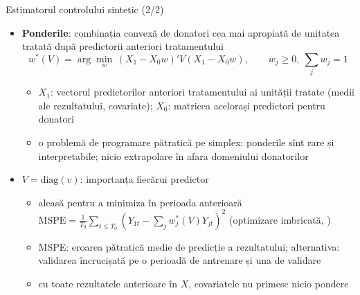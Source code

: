 \begin{frame}{Estimatorul controlului sintetic (2/2)}
\itemsize{\small}
\begin{itemize}
    \item \textbf{Ponderile}: combinația convexă de donatori cea mai apropiată de unitatea tratată după predictorii anteriori tratamentului \[ w^*(V) = \arg\min_w\, (X_1 - X_0w)'V(X_1 - X_0w), \qquad w_j \ge 0,\ \sum_j w_j = 1 \]
    \begin{itemize}
        \item $X_1$: vectorul predictorilor anteriori tratamentului ai unității tratate (medii ale rezultatului, covariate); $X_0$: matricea acelorași predictori pentru donatori
        \item o problemă de programare pătratică pe simplex: ponderile sînt rare și interpretabile; nicio extrapolare în afara domeniului donatorilor
    \end{itemize}
    \item $V = \mathrm{diag}(v)$: importanța fiecărui predictor
    \begin{itemize}
        \item aleasă pentru a minimiza în perioada anterioară $\mathrm{MSPE} = \frac{1}{T_0}\sum_{t \le T_0}(Y_{1t} - \sum_j w_j^*(V)Y_{jt})^2$ (optimizare imbricată, )
        \item MSPE: eroarea pătratică medie de predicție a rezultatului; alternativa: validarea încrucișată pe o perioadă de antrenare și una de validare 
        \item cu toate rezultatele anterioare în $X$, covariatele nu primesc nicio pondere 
    \end{itemize}
\end{itemize}
\end{frame}

